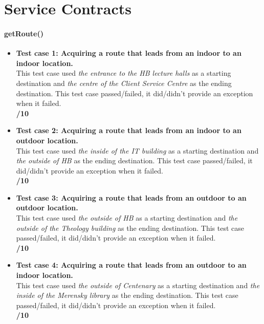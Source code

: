 \documentclass[runningheads,a4paper]{article}
\begin{document}



\begingroup



\tableofcontents


\endgroup

\newpage
	\section{Service Contracts}
	
	\paragraph{getRoute()}		\begin{itemize}			\item \textbf{Test case 1: Acquiring a route that leads from an indoor to an indoor location.} \\
							This test case used \textit{the entrance to the HB lecture halls} as a starting destination and \textit{the centre of the Client Service Centre} as the ending destination.
							This test case passed/failed, it did/didn't provide an exception when it failed.
							\\ \textbf{/10}
							
			\item \textbf{Test case 2: Acquiring a route that leads from an indoor to an outdoor location.} \\
							This test case used \textit{the inside of the IT building} as a starting destination and \textit{the outside of HB} as the ending destination.
							This test case passed/failed, it did/didn't provide an exception when it failed.
							\\ \textbf{/10}
							
			\item \textbf{Test case 3: Acquiring a route that leads from an outdoor to an outdoor location.} \\							This test case used \textit{the outside of HB} as a starting destination and \textit{the outside of the Theology building} as the ending destination.
							This test case passed/failed, it did/didn't provide an exception when it failed.
							\\ \textbf{/10}
							
			\item \textbf{Test case 4: Acquiring a route that leads from an outdoor to an indoor location.} \\
							This test case used \textit{the outside of Centenary} as a starting destination and \textit{the inside of the Merensky library} as the ending destination. 
							This test case passed/failed, it did/didn't provide an exception when it failed.
							\\ \textbf{/10}
		\end{itemize}
		
\end{document}
